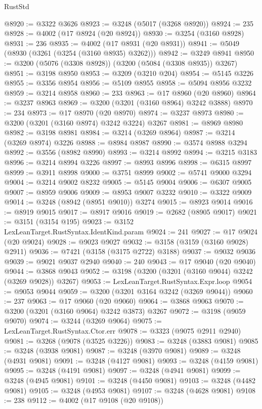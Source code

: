 \begin{lexlean}{RustStd}
\begin{coremodule}
@8920 := @3322 @3626
@8923 := @3248 (@5017 (@3268 @8920))
@8924 := 235
@8928 := @4002 (@17 @8924 (@20 @8924))
@8930 := @3254 (@3160 @8928)
@8931 := 236
@8935 := @4002 (@17 @8931 (@20 @8931))
@8941 := @5049 (@8930 (@3261 (@3254 (@3160 @8935) @3262)))
@8942 := @3249 @8941
@8950 := @3200 (@5076 (@3308 @8928)) (@3200 (@5084 (@3308 @8935)) @3267)
@8951 := @3198 @8950
@8953 := @3209 (@3210 @204)
@8954 := @5145 @3226
@8955 := @3356 @8954
@8956 := @5109 @8955
@8958 := @5094 @8956 @3232
@8959 := @3214 @8958
@8960 := 233
@8963 := @17 @8960 (@20 @8960)
@8964 := @3237 @8963
@8969 := @3200 (@3201 (@3160 @8964) @3242 @3888)
@8970 := 234
@8973 := @17 @8970 (@20 @8970)
@8974 := @3237 @8973
@8980 := @3200 (@3201 (@3160 @8974) @3242 @3224) @3267
@8981 := @8969 @8980
@8982 := @3198 @8981
@8984 := @3214 (@3269 @8964)
@8987 := @3214 (@3269 @8974) @3226
@8988 := @8984 @8987
@8990 := @3574 @8988 @3294
@8992 := @3556 (@8982 @8990)
@8993 := @3214 @8992
@8994 := @3215 @3183
@8996 := @3214 @8994 @3226
@8997 := @8993 @8996
@8998 := @6315 @8997
@8999 := @3911 @8998
@9000 := @3751 @8999
@9002 := @5741 @9000 @3294
@9004 := @3214 @9002 @8232
@9005 := @5145 @9004
@9006 := @6307 @9005
@9007 := @8959 @9006
@9009 := @8953 @9007 @3232
@9010 := @3322 @9009
@9014 := @3248 (@8942 (@8951 @9010)) @3274
@9015 := @8923 @9014
@9016 := @8919 @9015
@9017 := @8917 @9016
@9019 := @2682 (@8905 @9017)
@9021 := @3151 (@3154 @195)
@9023 := @3152 LexLeanTarget.RustSyntax.IdentKind.param
@9024 := 241
@9027 := @17 @9024 (@20 @9024)
@9028 := @9023 @9027
@9032 := @3158 (@3159 (@3160 @9028) @2911)
@9036 := @7421 (@3158 (@3175 @2722) @3188)
@9037 := @9032 @9036
@9039 := @9021 @9037 @2940
@9040 := 240
@9043 := @17 @9040 (@20 @9040)
@9044 := @3868 @9043
@9052 := @3198 (@3200 (@3201 (@3160 @9044) @3242 (@3269 @9028)) @3267)
@9053 := LexLeanTarget.RustSyntax.Expr.loop
@9054 := @9053 @9044
@9059 := @3200 (@3201 @3164 @3242 (@3269 @9044))
@9060 := 237
@9063 := @17 @9060 (@20 @9060)
@9064 := @3868 @9063
@9070 := @3200 (@3201 (@3160 @9064) @3242 @3873) @3267
@9072 := @3198 (@9059 @9070)
@9074 := @3244 (@3269 @9064)
@9075 := LexLeanTarget.RustSyntax.Ctor.err
@9078 := @3323 (@9075 @2911 @2940)
@9081 := @3268 (@9078 (@3525 @3226))
@9083 := @3248 (@3883 @9081)
@9085 := @3248 (@3938 @9081)
@9087 := @3248 (@3970 @9081)
@9089 := @3248 (@4931 @9081)
@9091 := @3248 (@4127 @9081)
@9093 := @3248 (@4159 @9081)
@9095 := @3248 (@4191 @9081)
@9097 := @3248 (@4941 @9081)
@9099 := @3248 (@4945 @9081)
@9101 := @3248 (@4450 @9081)
@9103 := @3248 (@4482 @9081)
@9105 := @3248 (@4953 @9081)
@9107 := @3248 (@4628 @9081)
@9108 := 238
@9112 := @4002 (@17 @9108 (@20 @9108))

\end{coremodule}
\end{lexlean}
